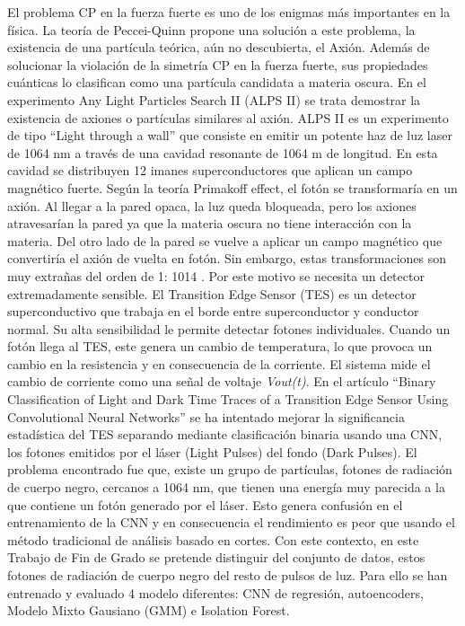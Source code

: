 El problema CP en la fuerza fuerte es uno de los enigmas más importantes en la física. La teoría de Peccei-Quinn propone una solución a este problema, la existencia de una partícula teórica, aún no descubierta, el Axión.
Además de solucionar la violación de la simetría CP en la fuerza fuerte, sus propiedades cuánticas lo clasifican como una partícula candidata a materia oscura.
En el experimento Any Light Particles Search II (ALPS II) se trata demostrar la existencia de axiones o partículas similares al axión. ALPS II es un experimento de tipo “Light through a wall” que consiste en emitir un potente haz de luz laser de 1064 nm a través de una cavidad resonante de 1064 m de longitud. En esta cavidad se distribuyen 12 imanes superconductores que aplican un campo magnético fuerte. Según la teoría Primakoff effect, el fotón se transformaría en un axión. Al llegar a la pared opaca, la luz queda bloqueada, pero los axiones atravesarían la pared ya que la materia oscura no tiene interacción con la materia. Del otro lado de la pared se vuelve a aplicar un campo magnético que convertiría el axión de vuelta en fotón. Sin embargo, estas transformaciones son muy extrañas del orden de 1: 1014 . Por este motivo se necesita un detector extremadamente sensible. 
El Transition Edge Sensor (TES) es un detector superconductivo que trabaja en el borde entre superconductor y conductor normal. Su alta sensibilidad le permite detectar fotones individuales. Cuando un fotón llega al TES, este genera un cambio de temperatura, lo que provoca un cambio en la resistencia y en consecuencia de la corriente. El sistema mide el cambio de corriente como una señal de voltaje \textit{Vout(t)}. En el artículo “Binary Classification of Light and Dark Time Traces of a Transition Edge Sensor Using Convolutional Neural Networks” \cite{rivasto2026} se ha intentado mejorar la significancia estadística del TES separando mediante clasificación binaria usando una CNN, los fotones emitidos por el láser (Light Pulses) del fondo (Dark Pulses). El problema encontrado fue que, existe un grupo de partículas, fotones de radiación de cuerpo negro, cercanos a 1064 nm, que tienen una energía muy parecida a la que contiene un fotón generado por el láser. 
Esto genera confusión en el entrenamiento de la CNN y en consecuencia el rendimiento es peor que usando el método tradicional de análisis basado en cortes. 
Con este contexto, en este Trabajo de Fin de Grado se pretende distinguir del conjunto de datos, estos fotones de radiación de cuerpo negro del resto de pulsos de luz. Para ello se han entrenado y evaluado 4 modelo diferentes: CNN de regresión, autoencoders, Modelo Mixto Gausiano (GMM) e Isolation Forest.




